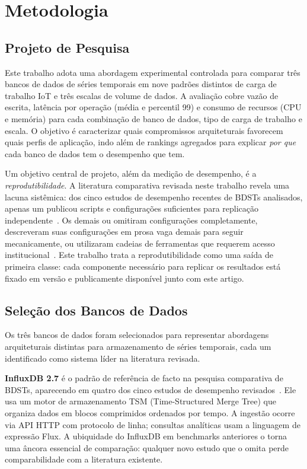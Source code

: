 \section{Metodologia}
\label{sec:methodology}

\subsection{Projeto de Pesquisa}

Este trabalho adota uma abordagem experimental controlada para comparar três bancos de dados de
séries temporais em nove padrões distintos de carga de trabalho IoT e três escalas de volume de
dados. A avaliação cobre vazão de escrita, latência por operação (média e percentil 99) e consumo
de recursos (CPU e memória) para cada combinação de banco de dados, tipo de carga de trabalho e
escala. O objetivo é caracterizar quais compromissos arquiteturais favorecem quais perfis de
aplicação, indo além de rankings agregados para explicar \textit{por que} cada banco de dados
tem o desempenho que tem.

Um objetivo central de projeto, além da medição de desempenho, é a \textit{reprodutibilidade}.
A literatura comparativa revisada neste trabalho revela uma lacuna sistêmica: dos cinco estudos
de desempenho recentes de BDSTs analisados, apenas um publicou scripts e configurações
suficientes para replicação independente~\citep{pereira2023mulletbench}. Os demais ou omitiram
configurações completamente, descreveram suas configurações em prosa vaga demais para seguir
mecanicamente, ou utilizaram cadeias de ferramentas que requerem acesso
institucional~\citep{shah2022performance,naqvi2017influxdb,lima2024avaliando,wang2023iotdb}.
Este trabalho trata a reprodutibilidade como uma saída de primeira classe: cada componente
necessário para replicar os resultados está fixado em versão e publicamente disponível junto
com este artigo.

\subsection{Seleção dos Bancos de Dados}

Os três bancos de dados foram selecionados para representar abordagens arquiteturais distintas
para armazenamento de séries temporais, cada um identificado como sistema líder na literatura
revisada.

\textbf{InfluxDB 2.7} é o padrão de referência de facto na pesquisa comparativa de BDSTs,
aparecendo em quatro dos cinco estudos de desempenho revisados~\citep{naqvi2017influxdb,
shah2022performance,lima2024avaliando,wang2023iotdb}. Ele usa um motor de armazenamento TSM
(Time-Structured Merge Tree) que organiza dados em blocos comprimidos ordenados por tempo. A
ingestão ocorre via API HTTP com protocolo de linha; consultas analíticas usam a linguagem de
expressão Flux. A ubiquidade do InfluxDB em benchmarks anteriores o torna uma âncora essencial
de comparação: qualquer novo estudo que o omita perde comparabilidade com a literatura existente.

